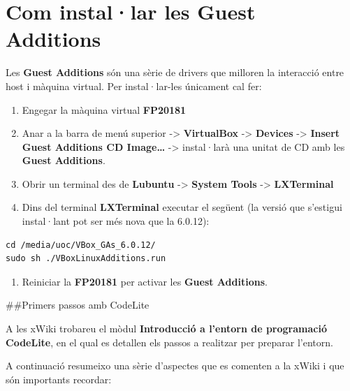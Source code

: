 \documentclass[]{book}
\providecommand{\tightlist}{%
  \setlength{\itemsep}{0pt}\setlength{\parskip}{0pt}}
\begin{document}
\hypertarget{com-installar-les-guest-additions}{%
\section{Com instal·lar les Guest Additions}\label{com-installar-les-guest-additions}}

Les \textbf{Guest Additions} són una sèrie de drivers que milloren la interacció entre host i màquina virtual. Per instal·lar-les únicament cal fer:

\begin{enumerate}
\def\labelenumi{\arabic{enumi}.}
\tightlist
\item
  Engegar la màquina virtual \textbf{FP20181}
\item
  Anar a la barra de menú superior -\textgreater{} \textbf{VirtualBox} -\textgreater{} \textbf{Devices} -\textgreater{} \textbf{Insert Guest Additions CD Image\ldots{}} -\textgreater{} instal·larà una unitat de CD amb les \textbf{Guest Additions}.
\item
  Obrir un terminal des de \textbf{Lubuntu} -\textgreater{} \textbf{System Tools} -\textgreater{} \textbf{LXTerminal}
\item
  Dins del terminal \textbf{LXTerminal} executar el següent (la versió que s'estigui instal·lant pot ser més nova que la 6.0.12):
\end{enumerate}

\begin{verbatim}
cd /media/uoc/VBox_GAs_6.0.12/     
sudo sh ./VBoxLinuxAdditions.run
\end{verbatim}

\begin{enumerate}
\def\labelenumi{\arabic{enumi}.}
\tightlist
\item
  Reiniciar la \textbf{FP20181} per activar les \textbf{Guest Additions}.
\end{enumerate}

\#\#Primers passos amb CodeLite

A les xWiki trobareu el mòdul \textbf{Introducció a l'entorn de programació CodeLite}, en el qual es detallen els passos a realitzar per preparar l'entorn.

A continuació resumeixo una sèrie d'aspectes que es comenten a la xWiki i que són importants recordar:
\end{document}
